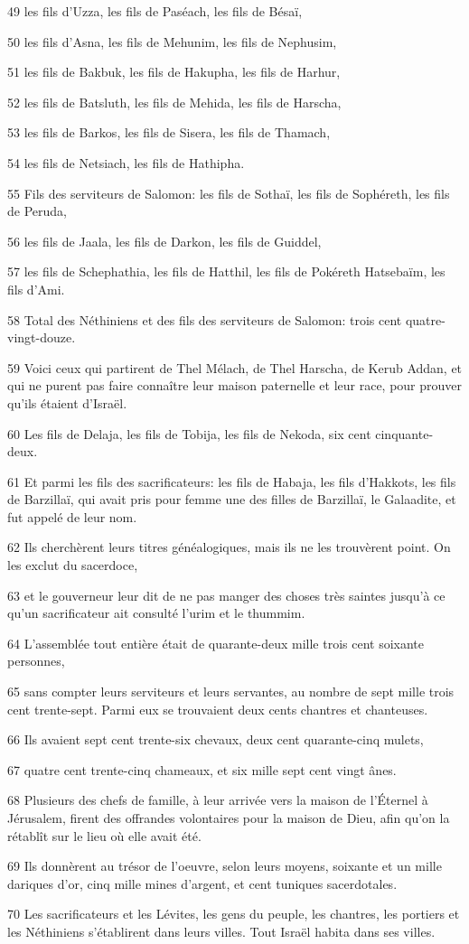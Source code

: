 \par 49 les fils d'Uzza, les fils de Paséach, les fils de Bésaï,
\par 50 les fils d'Asna, les fils de Mehunim, les fils de Nephusim,
\par 51 les fils de Bakbuk, les fils de Hakupha, les fils de Harhur,
\par 52 les fils de Batsluth, les fils de Mehida, les fils de Harscha,
\par 53 les fils de Barkos, les fils de Sisera, les fils de Thamach,
\par 54 les fils de Netsiach, les fils de Hathipha.
\par 55 Fils des serviteurs de Salomon: les fils de Sothaï, les fils de Sophéreth, les fils de Peruda,
\par 56 les fils de Jaala, les fils de Darkon, les fils de Guiddel,
\par 57 les fils de Schephathia, les fils de Hatthil, les fils de Pokéreth Hatsebaïm, les fils d'Ami.
\par 58 Total des Néthiniens et des fils des serviteurs de Salomon: trois cent quatre-vingt-douze.
\par 59 Voici ceux qui partirent de Thel Mélach, de Thel Harscha, de Kerub Addan, et qui ne purent pas faire connaître leur maison paternelle et leur race, pour prouver qu'ils étaient d'Israël.
\par 60 Les fils de Delaja, les fils de Tobija, les fils de Nekoda, six cent cinquante-deux.
\par 61 Et parmi les fils des sacrificateurs: les fils de Habaja, les fils d'Hakkots, les fils de Barzillaï, qui avait pris pour femme une des filles de Barzillaï, le Galaadite, et fut appelé de leur nom.
\par 62 Ils cherchèrent leurs titres généalogiques, mais ils ne les trouvèrent point. On les exclut du sacerdoce,
\par 63 et le gouverneur leur dit de ne pas manger des choses très saintes jusqu'à ce qu'un sacrificateur ait consulté l'urim et le thummim.
\par 64 L'assemblée tout entière était de quarante-deux mille trois cent soixante personnes,
\par 65 sans compter leurs serviteurs et leurs servantes, au nombre de sept mille trois cent trente-sept. Parmi eux se trouvaient deux cents chantres et chanteuses.
\par 66 Ils avaient sept cent trente-six chevaux, deux cent quarante-cinq mulets,
\par 67 quatre cent trente-cinq chameaux, et six mille sept cent vingt ânes.
\par 68 Plusieurs des chefs de famille, à leur arrivée vers la maison de l'Éternel à Jérusalem, firent des offrandes volontaires pour la maison de Dieu, afin qu'on la rétablît sur le lieu où elle avait été.
\par 69 Ils donnèrent au trésor de l'oeuvre, selon leurs moyens, soixante et un mille dariques d'or, cinq mille mines d'argent, et cent tuniques sacerdotales.
\par 70 Les sacrificateurs et les Lévites, les gens du peuple, les chantres, les portiers et les Néthiniens s'établirent dans leurs villes. Tout Israël habita dans ses villes.

